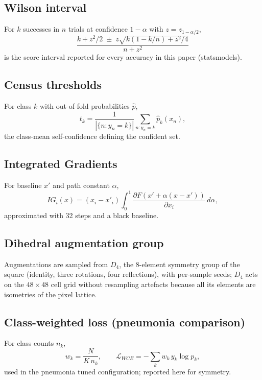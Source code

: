 \subsection{Wilson interval}
For $k$ successes in $n$ trials at confidence $1-\alpha$ with
$z = z_{1-\alpha/2}$,
\begin{equation}
\frac{k + z^2/2 \;\pm\; z\sqrt{k(1-k/n) + z^2/4}}{n + z^2}
\end{equation}
is the score interval reported for every accuracy in this paper
(statsmodels).
\subsection{Census thresholds}
For class $k$ with out-of-fold probabilities $\hat p$,
\begin{equation}
t_k = \frac{1}{|\{n: y_n = k\}|} \sum_{n: y_n = k} \hat p_k(x_n),
\end{equation}
the class-mean self-confidence defining the confident set.
\subsection{Integrated Gradients}
For baseline $x'$ and path constant $\alpha$,
\begin{equation}
IG_i(x) = (x_i - x'_i) \int_{0}^{1}
\frac{\partial F(x' + \alpha (x - x'))}{\partial x_i}\, d\alpha ,
\end{equation}
approximated with 32 steps and a black baseline.
\subsection{Dihedral augmentation group}
Augmentations are sampled from $D_4$, the 8-element symmetry group of the
square (identity, three rotations, four reflections), with per-sample
seeds; $D_4$ acts on the $48\times48$ cell grid without resampling
artefacts because all its elements are isometries of the pixel lattice.
\subsection{Class-weighted loss (pneumonia comparison)}
For class counts $n_k$,
\begin{equation}
w_k = \frac{N}{K\, n_k}, \qquad
\mathcal{L}_{WCE} = -\sum_k w_k\, y_k \log p_k ,
\end{equation}
used in the pneumonia tuned configuration; reported here for symmetry.
